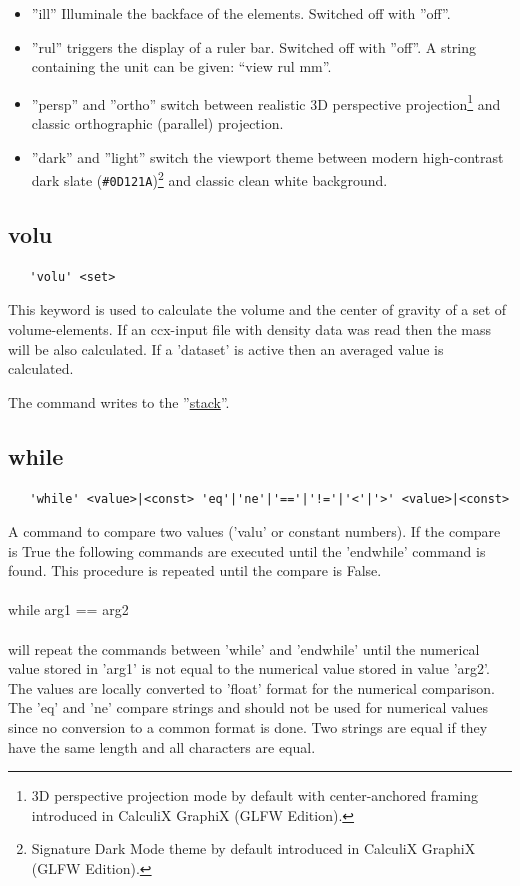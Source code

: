\documentclass{article}
\providecommand{\htmlref}[2]{\hyperref[#2]{#1}}
\begin{document}
\begin{itemize}
\item ''ill'' Illuminale the backface of the elements. Switched off with ''off''. 
\item ''rul'' triggers the display of a ruler bar. Switched off with ''off''. A string containing the unit can be given: ``view rul mm''. 
\item ''persp'' and ''ortho'' switch between realistic 3D perspective projection\footnote{3D perspective projection mode by default with center-anchored framing introduced in CalculiX GraphiX (GLFW Edition).} and classic orthographic (parallel) projection.
\item ''dark'' and ''light'' switch the viewport theme between modern high-contrast dark slate (\texttt{\#0D121A})\footnote{Signature Dark Mode theme by default introduced in CalculiX GraphiX (GLFW Edition).} and classic clean white background.
\end{itemize}  

\subsection{\label{volu}volu}
\begin{verbatim}
   'volu' <set>
\end{verbatim}
This keyword is used to calculate the volume and the center of gravity of a set of volume-elements. If an ccx-input file with density data was read then the mass will be also calculated. If a 'dataset' is active then an averaged value is calculated.

The command writes to the ''\htmlref{stack}{stack}''.

\subsection{\label{while}while}
\begin{verbatim}
   'while' <value>|<const> 'eq'|'ne'|'=='|'!='|'<'|'>' <value>|<const>
\end{verbatim}
A command to compare two values ('valu' or constant numbers). If the compare is True the following commands are executed until the 'endwhile' command is found. This procedure is repeated until the compare is False.
\\\\while arg1 == arg2\\\\will repeat the commands between 'while' and 'endwhile' until the numerical value stored in 'arg1' is not equal to the numerical value stored in value 'arg2'. The values are locally converted to 'float' format for the numerical comparison. The 'eq' and 'ne' compare strings and should not be used for numerical values since no conversion to a common format is done. Two strings are equal if they have the same length and all characters are equal.
\end{document}
